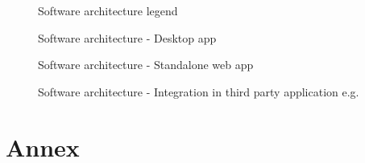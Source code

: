\documentclass[letterpaper,10pt, openany,english]{sphinxmanual}
\begin{document}
\begin{figure}[htbp]
\centering
\capstart

\noindent{}
\caption{Software architecture legend}\label{\detokenize{architecture:linkage-architecture-legend}}\end{figure}

\begin{figure}[htbp]
\centering
\capstart

\noindent{}
\caption{Software architecture - Desktop app}\label{\detokenize{architecture:linkage-architecture}}\end{figure}

\begin{figure}[htbp]
\centering
\capstart

\noindent{}
\caption{Software architecture - Standalone web app}\label{\detokenize{architecture:linkage-architecture-spa}}\end{figure}

\begin{figure}[htbp]
\centering
\capstart

\noindent{}
\caption{Software architecture - Integration in third party application e.g. }\label{\detokenize{architecture:linkage-architecture-os}}\end{figure}


\chapter{Annex}
\label{\detokenize{annex:annex}}\label{\detokenize{annex:sec-annex}}\label{\detokenize{annex::doc}}
\end{document}
